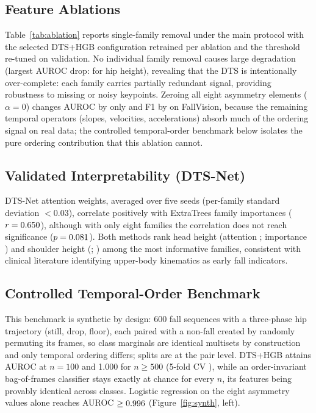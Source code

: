 \documentclass[letterpaper]{article}
\begin{document}
\subsection{Feature Ablations}
Table~\ref{tab:ablation} reports single-family removal under the main protocol with the selected DTS+HGB configuration retrained per ablation and the threshold re-tuned on validation. No individual family removal causes large degradation (largest AUROC drop: \abHipYda{} for hip height), revealing that the DTS is intentionally over-complete: each family carries partially redundant signal, providing robustness to missing or noisy keypoints. Zeroing all eight asymmetry elements ($\alpha = 0$) changes AUROC by only \abStaticda{} and F1 by \abStaticdf{} on FallVision, because the remaining temporal operators (slopes, velocities, accelerations) absorb much of the ordering signal on real data; the controlled temporal-order benchmark below isolates the pure ordering contribution that this ablation cannot.



\subsection{Validated Interpretability (DTS-Net)}
DTS-Net attention weights, averaged over five seeds (per-family standard deviation $< 0.03$), correlate positively with ExtraTrees family importances ($r = 0.650$), although with only eight families the correlation does not reach significance ($p = 0.081$). Both methods rank head height (attention \attntopw; importance \attntopei) and shoulder height (\attnsecw; \attnsecei) among the most informative families, consistent with clinical literature identifying upper-body kinematics as early fall indicators.

\subsection{Controlled Temporal-Order Benchmark}
This benchmark is synthetic by design: 600 fall sequences with a three-phase hip trajectory (still, drop, floor), each paired with a non-fall created by randomly permuting its frames, so class marginals are identical multisets by construction and only temporal ordering differs; splits are at the pair level. DTS+HGB attains AUROC \synthdtsathundred{} at $n = 100$ and 1.000 for $n \geq 500$ (5-fold CV \synthcv), while an order-invariant bag-of-frames classifier stays exactly at chance for every $n$, its features being provably identical across classes. Logistic regression on the eight asymmetry values alone reaches AUROC $\geq 0.996$ (Figure~\ref{fig:synth}, left).
\end{document}
